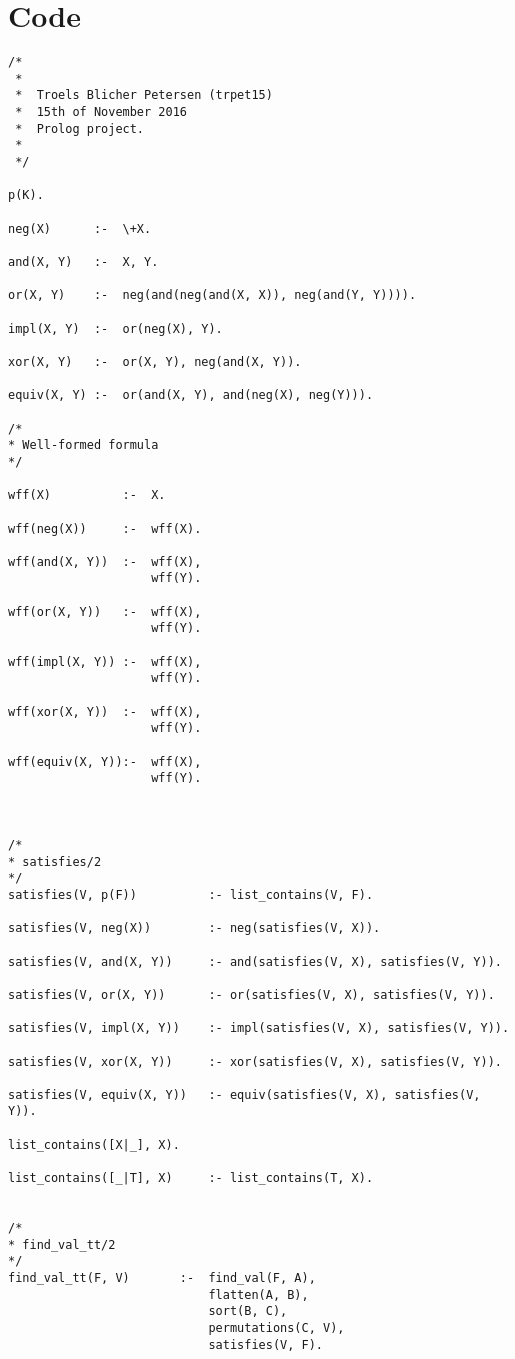 \documentclass[a4paper,10pt]{article}
\begin{document}
\section{Code}
\begin{lstlisting}
/*
 *
 *	Troels Blicher Petersen (trpet15)
 *	15th of November 2016
 *	Prolog project.
 *
 */

p(K).

neg(X)      :-  \+X.

and(X, Y)   :-  X, Y.

or(X, Y) 	:- 	neg(and(neg(and(X, X)), neg(and(Y, Y)))).

impl(X, Y)  :-  or(neg(X), Y).

xor(X, Y)   :- 	or(X, Y), neg(and(X, Y)).

equiv(X, Y) :-  or(and(X, Y), and(neg(X), neg(Y))).

/*
* Well-formed formula
*/

wff(X)			:-  X.

wff(neg(X))		:-	wff(X).

wff(and(X, Y))	:-	wff(X),
					wff(Y).

wff(or(X, Y))	:-	wff(X),
					wff(Y).

wff(impl(X, Y)) :- 	wff(X),
					wff(Y).

wff(xor(X, Y))	:-	wff(X),
					wff(Y).

wff(equiv(X, Y)):-	wff(X),
					wff(Y).



/*
* satisfies/2
*/
satisfies(V, p(F)) 			:- list_contains(V, F).

satisfies(V, neg(X))		:- neg(satisfies(V, X)).

satisfies(V, and(X, Y)) 	:- and(satisfies(V, X), satisfies(V, Y)).

satisfies(V, or(X, Y))		:- or(satisfies(V, X), satisfies(V, Y)).

satisfies(V, impl(X, Y))	:- impl(satisfies(V, X), satisfies(V, Y)).

satisfies(V, xor(X, Y))		:- xor(satisfies(V, X), satisfies(V, Y)).

satisfies(V, equiv(X, Y))	:- equiv(satisfies(V, X), satisfies(V, Y)).

list_contains([X|_], X).

list_contains([_|T], X) 	:- list_contains(T, X).


/*
* find_val_tt/2
*/
find_val_tt(F, V)		:-	find_val(F, A),
							flatten(A, B),
							sort(B, C),
							permutations(C, V),
							satisfies(V, F).


\end{lstlisting}
\end{document}
